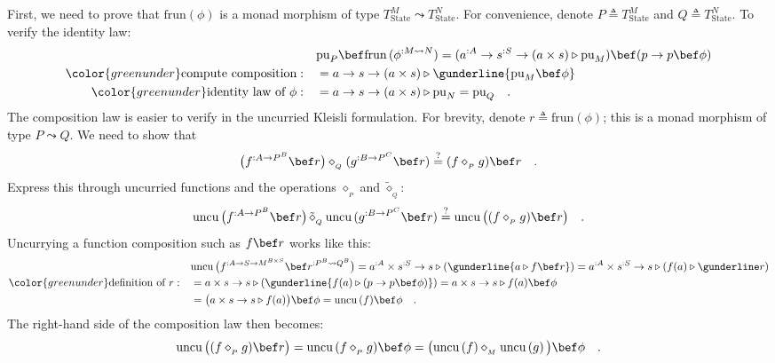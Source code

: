 First, we need to prove that $\text{frun}\left(\phi\right)$ is a
monad morphism of type $T_{\text{State}}^{M}\leadsto T_{\text{State}}^{N}$.
For convenience, denote $P\triangleq T_{\text{State}}^{M}$ and $Q\triangleq T_{\text{State}}^{N}$.
To verify the identity law:
\begin{align*}
 & \text{pu}_{P}\bef\text{frun}\,(\phi^{:M\leadsto N})=(a^{:A}\rightarrow s^{:S}\rightarrow(a\times s)\triangleright\text{pu}_{M})\bef(p\rightarrow p\bef\phi)\\
{\color{greenunder}\text{compute composition}:}\quad & =a\rightarrow s\rightarrow(a\times s)\triangleright\gunderline{\text{pu}_{M}\bef\phi}\\
{\color{greenunder}\text{identity law of }\phi:}\quad & =a\rightarrow s\rightarrow(a\times s)\triangleright\text{pu}_{N}=\text{pu}_{Q}\quad.
\end{align*}
The composition law is easier to verify in the uncurried Kleisli formulation.
For brevity, denote $r\triangleq\text{frun}\left(\phi\right)$; this
is a monad morphism of type $P\leadsto Q$. We need to show that
\[
\big(f^{:A\rightarrow P^{B}}\bef r\big)\diamond_{_{Q}}(g^{:B\rightarrow P^{C}}\bef r)\overset{?}{=}(f\diamond_{_{P}}g)\bef r\quad.
\]
Express this through uncurried functions and the operations $\diamond_{_{P}}$
and $\tilde{\diamond}_{_{Q}}$:
\[
\text{uncu}\,\big(f^{:A\rightarrow P^{B}}\bef r\big)\,\tilde{\diamond}_{_{Q}}\,\text{uncu}\,(g^{:B\rightarrow P^{C}}\bef r)\overset{?}{=}\text{uncu}\,\big((f\diamond_{_{P}}g)\bef r\big)\quad.
\]
Uncurrying a function composition such as $f\bef r$ works like this:
\begin{align}
 & \text{uncu}\,\big(f^{:A\rightarrow S\rightarrow M^{B\times S}}\bef r^{:P^{B}\leadsto Q^{B}}\big)=a^{:A}\times s^{:S}\rightarrow s\triangleright(\gunderline{a\triangleright f\bef r})=a^{:A}\times s^{:S}\rightarrow s\triangleright(f(a)\triangleright\gunderline r)\nonumber \\
{\color{greenunder}\text{definition of }r:}\quad & =a\times s\rightarrow s\triangleright(\gunderline{f(a)\triangleright(p\rightarrow p\bef\phi)})=a\times s\rightarrow s\triangleright f(a)\bef\phi\nonumber \\
 & =\big(a\times s\rightarrow s\triangleright f(a)\big)\bef\phi=\text{uncu}\,(f)\bef\phi\quad.\label{eq:uncurry-state-composition-derivation1}
\end{align}
The right-hand side of the composition law then becomes:
\[
\text{uncu}\,\big((f\diamond_{_{P}}g)\bef r\big)=\text{uncu}\,(f\diamond_{_{P}}g)\bef\phi=\big(\text{uncu}\left(f\right)\diamond_{_{M}}\text{uncu}\left(g\right)\big)\bef\phi\quad.
\]
